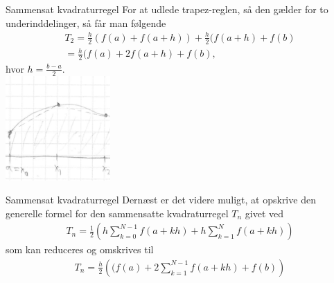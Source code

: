 \begin{frame}{Sammensat kvadraturregel}
    For at udlede trapez-reglen, så den gælder for to underinddelinger, så får man følgende 
    \begin{align*}
    T_2=\frac{h}{2}(f(a)+f(a+h))+\frac{h}{2}(f(a+h)+f(b) \\
    = \frac{h}{2}(f(a)+2f(a+h)+f(b),
    \end{align*}
    hvor $h=\frac{b-a}{2}$. \\
\includegraphics[width=40mm,scale=0.2]{images/TRAPEZ12.png}   
\end{frame}


\begin{frame}{Sammensat kvadraturregel}
Dernæst er det videre muligt, at opskrive den generelle formel for den sammensatte kvadraturregel $T_n$ givet ved
    \begin{align*}
    T_n = \frac{1}{2}\left (  h\sum_{k=0}^{N-1}f(a+kh)+h\sum_{k=1}^{N}f(a+kh)\right )
    \end{align*}
    som kan reduceres og omskrives til 
    \begin{align*}
    T_n =\frac{h}{2}\left ((f(a)+2\sum_{k=1}^{N-1}f(a+kh)+f(b) \right )
    \end{align*}
\end{frame}

